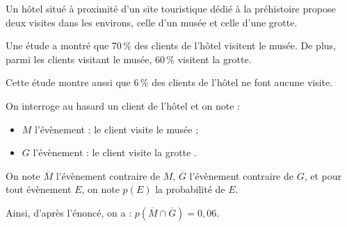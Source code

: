 Un hôtel situé à proximité d'un site touristique dédié à la préhistoire propose deux visites dans les environs, celle d'un musée et celle d'une grotte.

\medskip

Une étude a montré que 70\,\% des clients de l'hôtel visitent le musée. De plus, parmi les clients visitant le musée, 60\,\% visitent la grotte.

Cette étude montre aussi que 6\,\% des clients de l'hôtel ne font aucune visite.

On interroge au hasard un client de l'hôtel et on note :

\begin{itemize}
	\item $M$ l'évènement : \og le client visite le musée \fg{} ;
	\item $G$ l'évènement : \og le client visite la grotte \fg.
\end{itemize}

On note $\overline{M}$ l'évènement contraire de $M$,\: $\overline{G}$ l'évènement contraire de $G$, et pour tout évènement $E$, on note $p(E)$ la probabilité de $E$.

Ainsi, d'après l'énoncé, on a : $p\left(\overline{M} \cap \overline{G}\right) = 0,06$.

